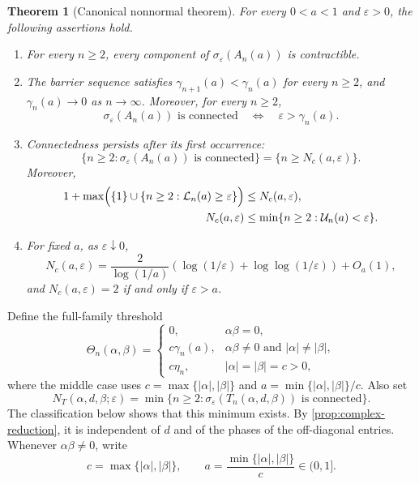 \documentclass[11pt,a4paper]{article}
\numberwithin{equation}{section}
\newtheorem{theorem}{Theorem}[section]
\begin{document}
\begin{theorem}[Canonical nonnormal theorem]\label{thm:canonical-main}
For every \(0<a<1\) and \(\varepsilon>0\), the following assertions hold.
\begin{enumerate}
\item For every \(n\geq2\), every component of
\(\sigma_\varepsilon(A_n(a))\) is contractible.
\item The barrier sequence satisfies
\(\gamma_{n+1}(a)<\gamma_n(a)\) for every \(n\geq2\), and
\(\gamma_n(a)\to0\) as \(n\to\infty\).  Moreover, for every \(n\geq2\),
\[
 \sigma_\varepsilon(A_n(a))\text{ is connected}
 \quad\Longleftrightarrow\quad \varepsilon>\gamma_n(a).
\]
\item Connectedness persists after its first occurrence:
\[
 \{n\geq2:\sigma_\varepsilon(A_n(a))\text{ is connected}\}
 =\{n\geq N_c(a,\varepsilon)\}.
\]
Moreover,
\begin{equation}\label{eq:N-two-sided-main}
 \begin{aligned}
  1+\max\Bigl(\{1\}\cup
  \{n\geq2:\mathcal L_n(a)\geq\varepsilon\}\Bigr)
  &\leq N_c(a,\varepsilon),\\
  N_c(a,\varepsilon)
  &\leq\min\{n\geq2:\mathcal U_n(a)<\varepsilon\}.
 \end{aligned}
\end{equation}
\item For fixed \(a\), as \(\varepsilon\downarrow0\),
\begin{equation}\label{eq:N-asymptotic-main}
 N_c(a,\varepsilon)=\frac{2}{\log(1/a)}
 \left(\log(1/\varepsilon)+\log\!\log(1/\varepsilon)\right)+O_a(1),
\end{equation}
and \(N_c(a,\varepsilon)=2\) if and only if \(\varepsilon>a\).
\end{enumerate}
\end{theorem}

Define the full-family threshold
\begin{equation}\label{eq:full-threshold}
 \Theta_n(\alpha,\beta)=
 \begin{cases}
  0,&\alpha\beta=0,\\
  c\gamma_n(a),&\alpha\beta\ne0\text{ and }|\alpha|\ne|\beta|,\\
  c\eta_n,&|\alpha|=|\beta|=c>0,
 \end{cases}
\end{equation}
where the middle case uses
\(c=\max\{|\alpha|,|\beta|\}\) and
\(a=\min\{|\alpha|,|\beta|\}/c\).  Also set
\[
 N_T(\alpha,d,\beta;\varepsilon)=
 \min\{n\geq2:\sigma_\varepsilon(T_n(\alpha,d,\beta))
 \text{ is connected}\}.
\]
The classification below shows that this minimum exists.  By
\cref{prop:complex-reduction}, it is independent of \(d\) and of the phases
of the off-diagonal entries.  Whenever \(\alpha\beta\ne0\), write
\[
 c=\max\{|\alpha|,|\beta|\},\qquad
 a=\frac{\min\{|\alpha|,|\beta|\}}{c}\in(0,1].
\]
\end{document}
